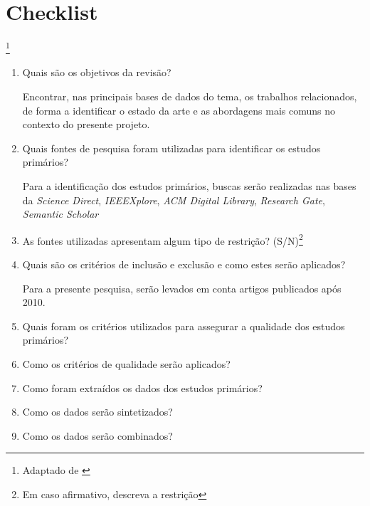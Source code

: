 \documentclass[a4paper,11pt]{article}
\begin{document}
\section{Checklist}\footnote{Adaptado de \cite{kitchenham2007guidelines}}
\begin{enumerate}
\item{Quais são os objetivos da revisão?}

Encontrar, nas principais bases de dados do tema, os trabalhos relacionados, de forma a identificar o estado da arte e as abordagens mais comuns no contexto do presente projeto.

\item{Quais fontes de pesquisa foram utilizadas para identificar os estudos primários?}

Para a identificação dos estudos primários, buscas serão realizadas nas bases da \emph{Science Direct}, \emph{IEEEXplore}, \emph{ACM Digital Library}, \emph{Research Gate}, \emph{Semantic Scholar}

\item{As fontes utilizadas apresentam algum tipo de restrição?  (S/N)\footnote{Em caso afirmativo, descreva a restrição}}
\item{Quais são os critérios de inclusão e exclusão e como estes serão aplicados?}

Para a presente pesquisa, serão levados em conta artigos publicados após 2010.

\item{Quais foram os critérios utilizados para assegurar a qualidade dos estudos primários?}

\item{Como os critérios de qualidade serão aplicados?}

\item{Como foram extraídos os dados dos estudos primários?}

\item{Como os dados serão sintetizados?}

\item{Como os dados serão combinados?}

\end{enumerate}


\end{document}
